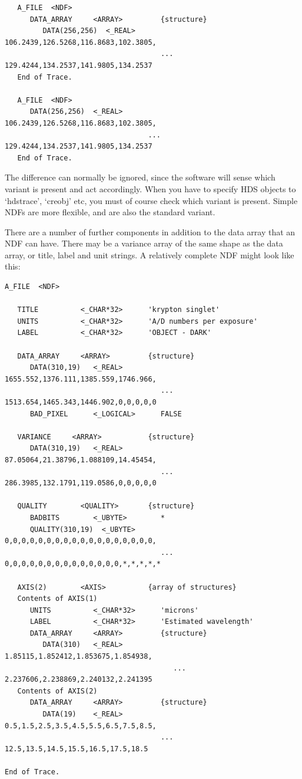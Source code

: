 \documentclass[11pt,twoside]{article}
\begin{document}
\begin{verbatim}
   A_FILE  <NDF>
      DATA_ARRAY     <ARRAY>         {structure}
         DATA(256,256)  <_REAL>         106.2439,126.5268,116.8683,102.3805,
                                     ... 129.4244,134.2537,141.9805,134.2537
   End of Trace.

   A_FILE  <NDF>
      DATA(256,256)  <_REAL>         106.2439,126.5268,116.8683,102.3805,
                                  ... 129.4244,134.2537,141.9805,134.2537
   End of Trace.
\end{verbatim}

   The difference can normally be ignored, since the software will sense
   which variant is present and act accordingly.  When you have to
   specify HDS objects to `hdstrace', `creobj' etc, you must of course
   check which variant is present.  Simple NDFs are more flexible, and
   are also the standard variant.

   There are a number of further components in addition to the data
   array that an NDF can have. There may be a variance array of the same
   shape as the data array, or title, label and unit strings. A
   relatively complete NDF might look like this:

\begin{verbatim}
A_FILE  <NDF>

   TITLE          <_CHAR*32>      'krypton singlet'
   UNITS          <_CHAR*32>      'A/D numbers per exposure'
   LABEL          <_CHAR*32>      'OBJECT - DARK'

   DATA_ARRAY     <ARRAY>         {structure}
      DATA(310,19)   <_REAL>         1655.552,1376.111,1385.559,1746.966,
                                     ... 1513.654,1465.343,1446.902,0,0,0,0,0
      BAD_PIXEL      <_LOGICAL>      FALSE

   VARIANCE     <ARRAY>           {structure}
      DATA(310,19)   <_REAL>         87.05064,21.38796,1.088109,14.45454,
                                     ... 286.3985,132.1791,119.0586,0,0,0,0,0

   QUALITY        <QUALITY>       {structure}
      BADBITS        <_UBYTE>        *
      QUALITY(310,19)  <_UBYTE>      0,0,0,0,0,0,0,0,0,0,0,0,0,0,0,0,0,0,
                                     ... 0,0,0,0,0,0,0,0,0,0,0,0,0,0,*,*,*,*,*

   AXIS(2)        <AXIS>          {array of structures}
   Contents of AXIS(1)
      UNITS          <_CHAR*32>      'microns'
      LABEL          <_CHAR*32>      'Estimated wavelength'
      DATA_ARRAY     <ARRAY>         {structure}
         DATA(310)   <_REAL>            1.85115,1.852412,1.853675,1.854938,
                                        ... 2.237606,2.238869,2.240132,2.241395
   Contents of AXIS(2)
      DATA_ARRAY     <ARRAY>         {structure}
         DATA(19)    <_REAL>         0.5,1.5,2.5,3.5,4.5,5.5,6.5,7.5,8.5,
                                     ... 12.5,13.5,14.5,15.5,16.5,17.5,18.5

End of Trace.
\end{verbatim}
\end{document}
